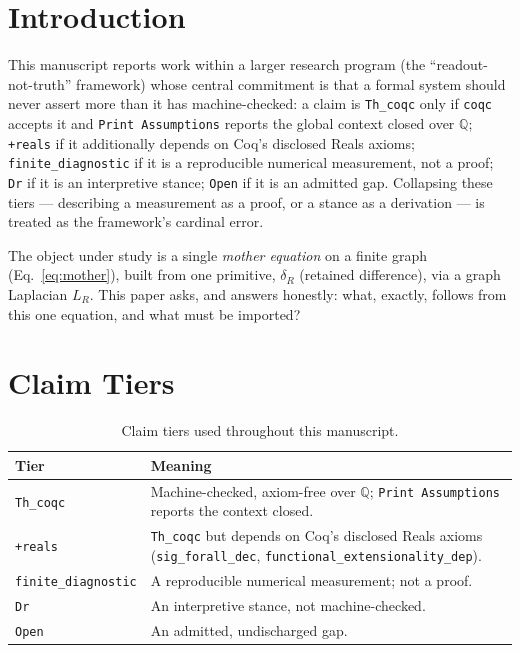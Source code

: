 \documentclass[10pt,twocolumn]{article}
\begin{document}
\section{Introduction}
This manuscript reports work within a larger research program (the ``readout-not-truth''
framework) whose central commitment is that a formal system should never assert more
than it has machine-checked: a claim is \texttt{Th\_coqc} only if \texttt{coqc} accepts
it and \texttt{Print Assumptions} reports the global context closed over $\mathbb{Q}$;
\texttt{+reals} if it additionally depends on Coq's disclosed Reals axioms;
\texttt{finite\_diagnostic} if it is a reproducible numerical measurement, not a proof;
\texttt{Dr} if it is an interpretive stance; \texttt{Open} if it is an admitted gap.
Collapsing these tiers --- describing a measurement as a proof, or a stance as a
derivation --- is treated as the framework's cardinal error.

The object under study is a single \emph{mother equation} on a finite graph
(Eq.~\ref{eq:mother}), built from one primitive, $\delta_R$ (retained difference), via
a graph Laplacian $L_R$. This paper asks, and answers honestly: what, exactly, follows
from this one equation, and what must be imported?

\section{Claim Tiers}
\label{sec:tiers}
\begin{table}[h]
\centering
\small
\begin{tabularx}{\linewidth}{@{}lY@{}}
\toprule
\textbf{Tier} & \textbf{Meaning} \\
\midrule
\texttt{Th\_coqc} & Machine-checked, axiom-free over $\mathbb{Q}$; \texttt{Print Assumptions} reports the context closed. \\
\texttt{+reals} & \texttt{Th\_coqc} but depends on Coq's disclosed Reals axioms (\texttt{sig\_forall\_dec}, \texttt{functional\_extensionality\_dep}). \\
\texttt{finite\_diagnostic} & A reproducible numerical measurement; not a proof. \\
\texttt{Dr} & An interpretive stance, not machine-checked. \\
\texttt{Open} & An admitted, undischarged gap. \\
\bottomrule
\end{tabularx}
\caption{Claim tiers used throughout this manuscript.}
\label{tab:tiers}
\end{table}
\end{document}
